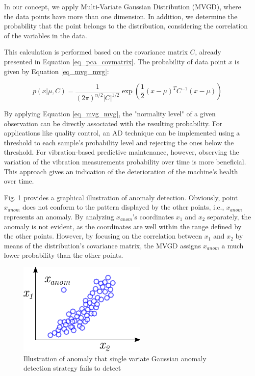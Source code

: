 \documentclass[conference]{IEEEtran}
\begin{document}
In our concept, we apply Multi-Variate Gaussian Distribution (MVGD), where the data points have more than one dimension. In addition, we determine the probability that the point belongs to the distribution, considering the correlation of the variables in the data.

This calculation is performed based on the covariance matrix $C$, already presented in Equation \ref{eq_pca_covmatrix}. The probability of data point $x$ is given by Equation \ref{eq_mvg_mvg}:

\begin{equation}
	\label{eq_mvg_mvg}
	p(x|\mu,C)=\frac{1}{(2\pi)^{n/2}|C|^{1/2}}\exp{\left(\frac{1}{2}(x-\mu)^{T}C^{-1}(x-\mu)\right) }
\end{equation}

By applying Equation \ref{eq_mvg_mvg}, the "normality level" of a given observation can be directly associated with the resulting probability. For applications like quality control, an AD technique can be implemented using a threshold to each sample's probability level and rejecting the ones below the threshold. For vibration-based predictive maintenance, however, observing the variation of the vibration measurements probability over time is more beneficial. This approach gives an indication of the deterioration of the machine's health over time.

Fig. \ref{fig_mvg_singlecaseinnadequade} provides a graphical illustration of anomaly detection. Obviously, point $x_{anom}$ does not conform to the pattern displayed by the other points, i.e., $x_{anom}$ represents an anomaly. By analyzing $x_{anom}$'s coordinates $x_{1}$ and $x_{2}$ separately, the anomaly is not evident, as the coordinates are well within the range defined by the other points. However, by focusing on the correlation between $x_{1}$ and $x_{2}$ by means of the distribution's covariance matrix, the MVGD assigns $x_{anom}$ a much lower probability than the other points.

\begin{figure}[htbp]
\centerline{\includegraphics[width=0.5\columnwidth]{graphics/single_variab_innadequate.pdf}}
\caption{Illustration of anomaly that single variate Gaussian anomaly detection strategy fails to detect}
\label{fig_mvg_singlecaseinnadequade}
\end{figure}
\end{document}
